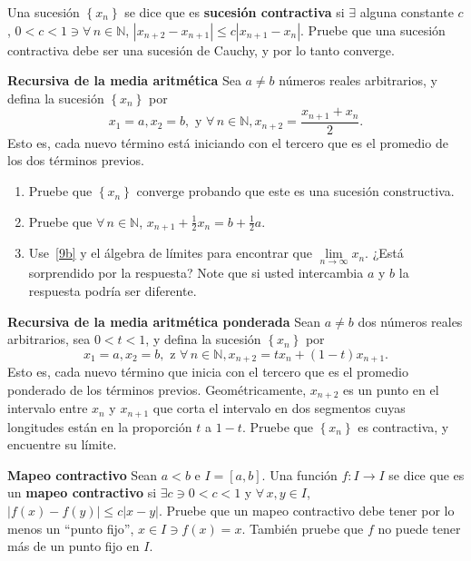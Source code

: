 \begin{prob}
Una sucesión $\left\{x_{n}\right\}$ se dice que es \textbf{sucesión contractiva} si $\exists$ alguna constante $c$, $0<c<1\ni\forall\,n\in\mathbb{N}$, $|x_{n+2}-x_{n+1}|\leq c|x_{n+1}-x_{n}|$. Pruebe que una sucesión contractiva debe ser una sucesión de Cauchy, y por lo tanto converge.
\end{prob}

\begin{prob}
\textbf{Recursiva de la media aritmética} Sea $a\neq b$ números reales arbitrarios, y defina la sucesión $\left\{x_{n}\right\}$ por
\[ x_{1}=a,x_{2}=b,\text{ y }\forall\,n\in\mathbb{N},x_{n+2}=\frac{x_{n+1}+x_{n}}{2}. \] Esto es, cada nuevo término está iniciando con el tercero que es el promedio de los dos términos previos.
\begin{enumerate}
	\item Pruebe que $\left\{x_{n}\right\}$ converge probando que este es una sucesión constructiva.
	\item Pruebe que $\forall\,n\in\mathbb{N}$, $x_{n+1}+\frac{1}{2}x_{n}=b+\frac{1}{2}a$.\label{9b}
	\item Use~\ref{9b} y el álgebra de límites para encontrar que  $\lim\limits_{n\to\infty}x_{n}$. ¿Está sorprendido por la respuesta? Note que si usted intercambia $a$ y $b$ la respuesta podría ser diferente.
\end{enumerate}
\end{prob}

\begin{prob}
\textbf{Recursiva de la media aritmética ponderada} Sean $a\neq b$ dos números reales arbitrarios, sea $0<t<1$, y defina la sucesión $\left\{x_{n}\right\}$ por \[ x_{1}=a, x_{2}=b,\text{ z }\forall\,n\in\mathbb{N}, x_{n+2}=tx_{n}+\left(1-t\right)x_{n+1}. \] Esto es, cada nuevo término que inicia con el tercero que es el promedio ponderado de los términos previos. Geométricamente, $x_{n+2}$ es un punto en el intervalo entre $x_{n}$ y $x_{n+1}$ que corta el intervalo en dos segmentos cuyas longitudes están en la proporción $t$ a $1-t$. Pruebe que $\left\{x_{n}\right\}$ es contractiva, y encuentre su límite.
\end{prob}

\begin{prob}
\textbf{Mapeo contractivo} Sean $a<b$ e $I=\left[a,b\right]$. Una función $f\colon I\rightarrow I$ se dice que es un \textbf{mapeo contractivo} si $\exists c\ni0<c<1$ y $\forall\,x,y\in I$, $|f\left(x\right)-f\left(y\right)|\leq c|x-y|$. Pruebe que un mapeo contractivo debe tener por lo menos un ``punto fijo'', $x\in I\ni f\left(x\right)=x$. También pruebe que $f$ no puede tener más de un punto fijo en $I$.
\end{prob}

